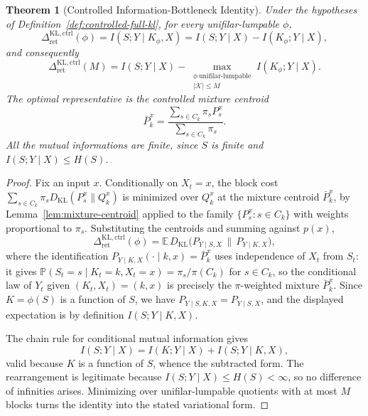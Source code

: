 \documentclass[12pt]{article}
\newtheorem{theorem}{Theorem}[section]
\theoremstyle{definition}
\newcommand{\RetKLc}{\Delta_{\mathrm{ret}}^{\mathrm{KL,ctrl}}}
\begin{document}
\begin{theorem}[Controlled Information-Bottleneck Identity]
\label{thm:controlled-ib}
Under the hypotheses of Definition~\ref{def:controlled-full-kl}, for every
unifilar-lumpable $\phi$,
\[
\RetKLc(\phi)
=
I(S;Y\mid K_\phi,X)
=
I(S;Y\mid X)-I(K_\phi;Y\mid X),
\]
and consequently
\[
\RetKLc(M)
=
I(S;Y\mid X)
-
\max_{\substack{\phi\ \text{unifilar-lumpable}\\|\mathcal K|\le M}}
I(K_\phi;Y\mid X).
\]
The optimal representative is the controlled mixture centroid
\[
\bar P_k^x
=
\frac{\sum_{s\in C_k}\pi_sP_s^x}{\sum_{s\in C_k}\pi_s}.
\]
All the mutual informations are finite, since $S$ is finite and
$I(S;Y\mid X)\le H(S)$.
\end{theorem}

\begin{proof}
Fix an input $x$.  Conditionally on $X_t=x$, the block cost
$\sum_{s\in C_k}\pi_sD_{\mathrm{KL}}(P_s^x\|Q_k^x)$ is minimized over $Q_k^x$
at the mixture centroid $\bar P_k^x$, by Lemma~\ref{lem:mixture-centroid}
applied to the family $\{P_s^x:s\in C_k\}$ with weights proportional to
$\pi_s$.  Substituting the centroids and summing against $p(x)$,
\[
\RetKLc(\phi)
=
\mathbb E\,D_{\mathrm{KL}}
\bigl(P_{Y\mid S,X}\,\big\|\,P_{Y\mid K,X}\bigr),
\]
where the identification $P_{Y\mid K,X}(\cdot\mid k,x)=\bar P_k^x$ uses
independence of $X_t$ from $S_t$: it gives
$\mathbb P(S_t=s\mid K_t=k,X_t=x)=\pi_s/\pi(C_k)$ for $s\in C_k$, so the
conditional law of $Y_t$ given $(K_t,X_t)=(k,x)$ is precisely the
$\pi$-weighted mixture $\bar P_k^x$.  Since $K=\phi(S)$ is a function of $S$,
we have $P_{Y\mid S,K,X}=P_{Y\mid S,X}$, and the displayed expectation is by
definition $I(S;Y\mid K,X)$.

The chain rule for conditional mutual information gives
\[
I(S;Y\mid X)=I(K;Y\mid X)+I(S;Y\mid K,X),
\]
valid because $K$ is a function of $S$, whence the subtracted form.  The
rearrangement is legitimate because $I(S;Y\mid X)\le H(S)<\infty$, so no
difference of infinities arises.  Minimizing over unifilar-lumpable quotients
with at most $M$ blocks turns the identity into the stated variational form.
\end{proof}
\end{document}
